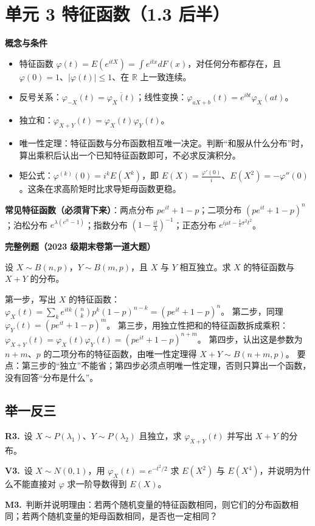 \documentclass[UTF8,a4paper,11pt]{ctexart}
\newcommand{\PracticeQuestion}[3]{\par\Needspace{4\baselineskip}\noindent\begin{minipage}{\linewidth}\textbf{#1.}\ #2\par\noindent\rule{0pt}{#3mm}\par\end{minipage}\par}
\begin{document}
\section{单元 3 特征函数（1.3 后半）}
\textbf{概念与条件}

\begin{itemize}
\item 特征函数 $\varphi(t)=E(e^{itX})=\int e^{itx}dF(x)$，对任何分布都存在，且 $\varphi(0)=1$、$|\varphi(t)|\le 1$、在 $\mathbb{R}$ 上一致连续。
\item 反号关系：$\varphi_{-X}(t)=\overline{\varphi_X(t)}$；线性变换：$\varphi_{aX+b}(t)=e^{ibt}\varphi_X(at)$。
\item 独立和：$\varphi_{X+Y}(t)=\varphi_X(t)\varphi_Y(t)$。
\item 唯一性定理：特征函数与分布函数相互唯一决定。判断“和服从什么分布”时，算出乘积后认出一个已知特征函数即可，不必求反演积分。
\item 矩公式：$\varphi^{(k)}(0)=i^kE(X^k)$，即 $E(X)=\frac{\varphi'(0)}{i}$、$E(X^2)=-\varphi''(0)$。这条在求高阶矩时比求导矩母函数更稳。
\end{itemize}
\textbf{常见特征函数（必须背下来）}：两点分布 $pe^{it}+1-p$；二项分布 $(pe^{it}+1-p)^n$；泊松分布 $e^{\lambda(e^{it}-1)}$；指数分布 $\left(1-\frac{it}{\lambda}\right)^{-1}$；正态分布 $e^{i\mu t-\frac12\sigma^2t^2}$。

\textbf{完整例题（2023 级期末卷第一道大题）}

设 $X\sim B(n,p)$，$Y\sim B(m,p)$，且 $X$ 与 $Y$ 相互独立。求 $X$ 的特征函数与 $X+Y$ 的分布。

第一步，写出 $X$ 的特征函数：$\varphi_X(t)=\sum_k e^{itk}\binom{n}{k}p^k(1-p)^{n-k}=(pe^{it}+1-p)^n$。 第二步，同理 $\varphi_Y(t)=(pe^{it}+1-p)^m$。 第三步，用独立性把和的特征函数拆成乘积：$\varphi_{X+Y}(t)=\varphi_X(t)\varphi_Y(t)=(pe^{it}+1-p)^{n+m}$。 第四步，认出这是参数为 $n+m$、$p$ 的二项分布的特征函数，由唯一性定理得 $X+Y\sim B(n+m,p)$。 要点：第三步的“独立”不能省；第四步必须点明唯一性定理，否则只算出一个函数，没有回答“分布是什么”。

\subsection{举一反三}
\PracticeQuestion{R3}{设 $X\sim P(\lambda_1)$、$Y\sim P(\lambda_2)$ 且独立，求 $\varphi_{X+Y}(t)$ 并写出 $X+Y$ 的分布。}{42}
\PracticeQuestion{V3}{设 $X\sim N(0,1)$，用 $\varphi_X(t)=e^{-t^2/2}$ 求 $E(X^2)$ 与 $E(X^4)$，并说明为什么不能直接对 $\varphi$ 求一阶导数得到 $E(X)$。}{34}
\PracticeQuestion{M3}{判断并说明理由：若两个随机变量的特征函数相同，则它们的分布函数相同；若两个随机变量的矩母函数相同，是否也一定相同？}{34}
\clearpage
{}
\end{document}
